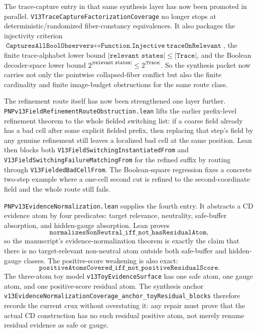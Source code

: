 \documentclass[11pt]{article}
\theoremstyle{remark}
\begin{document}
The trace-capture entry in that same synthesis layer has now been promoted in
parallel.  \texttt{V13TraceCaptureFactorizationCoverage} no longer stops at
deterministic/randomized fiber-constancy equivalences.  It also packages the
injectivity criterion
\(
  \texttt{CapturesAllBoolObservers}
  \leftrightarrow
  \texttt{Function.Injective}\ \texttt{traceOnRelevant}
\),
the finite trace-alphabet lower bound
\(
  |\texttt{relevant states}| \le |\texttt{Trace}|
\),
and the Boolean decoder-space lower bound
\(
  2^{|\texttt{relevant states}|} \le 2^{|\texttt{Trace}|}
\).
So the synthesis packet now carries not only the pointwise collapsed-fiber
conflict but also the finite cardinality and finite image-budget obstructions
for the same route class.

The refinement route itself has now been strengthened one layer further.
\texttt{PNPv13FieldRefinementRouteObstruction.lean} lifts the earlier
prefix-level refinement theorem to the whole fielded switching list: if a
coarse field already has a bad cell after some explicit fielded prefix, then
replacing that step's field by any genuine refinement still leaves a localized
bad cell at the same position.  Lean then blocks both
\texttt{V13FieldSwitchingInstantiatedFrom} and
\texttt{V13FieldSwitchingFailureMatchingFrom} for the refined suffix by routing
through \texttt{V13FieldedBadCellFrom}.  The Boolean-square regression fixes a
concrete two-step example where a one-cell second cut is refined to the
second-coordinate field and the whole route still fails.

\texttt{PNPv13EvidenceNormalization.lean} supplies the fourth entry.  It
abstracts a CD evidence atom by four predicates: target relevance, neutrality,
safe-buffer absorption, and hidden-gauge absorption.  Lean proves
\[
  \texttt{normalizesNonNeutral\_iff\_not\_hasResidualAtom},
\]
so the manuscript's evidence-normalization theorem is exactly the claim that
there is no target-relevant non-neutral atom outside both safe-buffer and
hidden-gauge classes.  The positive-score weakening is also exact:
\[
  \texttt{positiveAtomsCovered\_iff\_not\_positiveResidualScore}.
\]
The three-atom toy model
\texttt{v13ToyEvidenceSurface} has one safe atom, one gauge atom, and one
positive-score residual atom.  The synthesis anchor
\texttt{v13EvidenceNormalizationCoverage\_anchor\_toyResidual\_blocks}
therefore records the current crux without overstating it: any repair must
prove that the actual CD construction has no such residual positive atom, not
merely rename residual evidence as safe or gauge.
\end{document}
